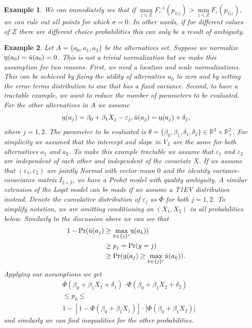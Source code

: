 \documentclass[reqno]{article}
\newtheorem{example}{Example}
\begin{document}
\begin{example}
We can immediately see that if $\underset{z\in Z}{\max }F_{\varepsilon
}^{-1}(p_{1|z})>\underset{z\in Z}{\min }F_{\varepsilon }(p_{1|z})$, we can
rule out all points for which $\sigma =0$. In other words, if for different
values of $Z$ there are different choice probabilities this can only be a
result of ambiguity. \newline
\relax
\end{example}

\begin{example}
Let $A=\{a_{0},a_{1},a_{2}\}$ be the alternatives set. Suppose we normalize $%
\text{\b{u}}(a_{0})=\bar{u}(a_{0})=0$. This is not a trivial normalization but we
make this assumption for two reasons. First, we need a location and scale
normalizations. This can be achieved by fixing the utility of alternative $%
a_{0}$ to zero and by setting the error terms distribution to one that has a
fixed variance. Second, to have a tractable example, we want to reduce the
number of parameters to be evaluated. For the other alternatives in $A$ we
assume%
\begin{equation*}
\text{\b{u}}(a_{j})=\beta _{0}+\beta _{1}X_{j}-\varepsilon
_{j},\bar{u}(a_{j})=\text{\b{u}}(a_{j})+\delta _{j}\text{,}
\end{equation*}%
where $j=1,2.$ The parameter to be evaluated is $\theta =\{\beta _{0},\beta
_{1},\delta _{1},\delta _{2}\}\in \mathbb{R}^{2} \times \mathbb{R}_{+}^{2}$. For simplicity we assumed that the intercept and slope in $V_{L}$
are the same for both alternatives $a_{1}$ and $a_{2}$. To make this example
tractable we assume that $\varepsilon _{1}$ and $\varepsilon _{2}$ are
independent of each other and independent of the covariate $X$. If we assume
that $(\varepsilon _{1},\varepsilon _{2})$ are jointly Normal with vector
mean $0$ and the identity variance-covariance matrix $I_{2\times 2}$, we
have a Probit model with quality ambiguity. A similar extension of the Logit
model can be made if we assume a T1EV distribution instead. Denote the
cumulative distribution of $\varepsilon _{j}$ as $\Phi $ for both $j=1,2$.
To simplify notation, we are omitting conditioning on $(X_{1},X_{2})$ in all
probabilities below. Similarly to the discussion above we can see that 
\begin{align*}
1-\Pr (\bar{u}(a_{j})& \geq \underset{k\in \{j\}^{c}}{\max }\text{\b{u}}(a_{k})) \\
& \geq p_{j}=\Pr (y=j) \\
& \geq \Pr (\text{\b{u}}(a_{j})\geq \underset{k\in \{j\}^{c}}{\max }\bar{u}(a_{k}))%
\text{.}
\end{align*}%
Applying our assumptions we get 
\begin{align*}
& \Phi (\beta _{0}+\beta _{1}X_{1}+\delta _{1})\cdot \Phi (\beta _{0}+\beta
_{1}X_{2}+\delta _{2}) \\
& \leq p_{0}\leq \\
& 1-[1-\Phi (\beta _{0}+\beta _{1}X_{1})]\cdot \lbrack \Phi (\beta
_{0}+\beta _{1}X_{2})]
\end{align*}%
and similarly we can find inequalities for the other probabilities.
\end{example}
\end{document}
